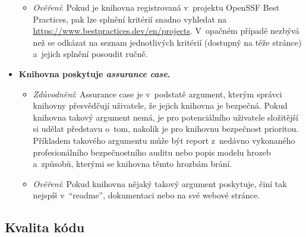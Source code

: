 \begin{itemize}
\begin{itemize}[beginpenalty=10000]
        \item \textit{Ověření}: Pokud je knihovna registrovaná v~projektu OpenSSF Best Practices, pak lze splnění kritérií snadno vyhledat na \url{https://www.bestpractices.dev/en/projects}. V~opačném případě nezbývá než se odkázat na seznam jednotlivých kritérií (dostupný na téže stránce) a~jejich splnění posoudit ručně.
    \end{itemize}

    \item \textbf{Knihovna poskytuje \textit{assurance case}.} 
    \begin{itemize}[beginpenalty=10000]
        \item \textit{Zdůvodnění}: Assurance case je v~podstatě argument, kterým správci knihovny přes\-věd\-ču\-jí uživatele, že jejich knihovna je bezpečná. Pokud knihovna takový argument nemá, je pro potenciálního uživatele složitější si udělat představu o~tom, nakolik je pro knihovnu bezpečnost prioritou. Příkladem takového argumentu může být report z~nedávno vykonaného profesionálního bezpečnostního auditu nebo popis modelu hrozeb a~způsobů, kterými se knihovna těmto hrozbám brání.

        \item \textit{Ověření}: Pokud knihovna nějaký takový argument poskytuje, činí tak nejspíš v~``readme'', dokumentaci nebo na své webové stránce.
    \end{itemize}
\end{itemize}

\subsection{Kvalita kódu}


